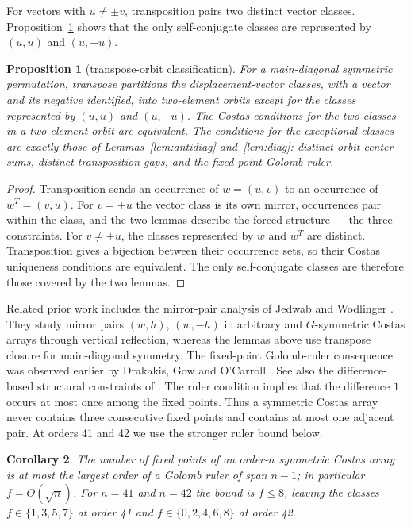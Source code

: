 \documentclass[11pt]{article}
\newtheorem{proposition}{Proposition}
\newtheorem{corollary}[proposition]{Corollary}
\begin{document}
For vectors with $u\neq\pm v$, transposition pairs two distinct vector
classes.  Proposition~\ref{prop:complete} shows that the only
self-conjugate classes are represented by $(u,u)$ and $(u,-u)$.

\begin{proposition}[transpose-orbit classification]
\label{prop:complete}
For a main-diagonal symmetric permutation, transpose partitions the
displacement-vector classes, with a vector and its negative identified,
into two-element orbits except for the classes represented by $(u,u)$ and
$(u,-u)$.  The Costas conditions for the two classes in a two-element
orbit are equivalent.  The conditions for the exceptional classes are
exactly those of Lemmas~\ref{lem:antidiag} and~\ref{lem:diag}: distinct
orbit center sums, distinct transposition gaps, and the fixed-point Golomb
ruler.
\end{proposition}

\begin{proof}
Transposition sends an occurrence of $w=(u,v)$ to an occurrence of
$w^{T}=(v,u)$.  For $v=\pm u$ the vector class is its own mirror,
occurrences pair within the class, and the two lemmas describe the forced
structure --- the three constraints.  For $v\neq\pm u$, the classes
represented by $w$ and $w^{T}$ are distinct.  Transposition gives a
bijection between their occurrence sets, so their Costas uniqueness
conditions are equivalent.  The only self-conjugate classes are therefore
those covered by the two lemmas.
\end{proof}

Related prior work includes the mirror-pair analysis of Jedwab and
Wodlinger \cite{JedwabWodlinger2014}.  They study mirror pairs $(w,h)$,
$(w,-h)$ in arbitrary and $G$-symmetric Costas arrays through vertical
reflection, whereas the lemmas above use transpose closure for
main-diagonal symmetry.  The fixed-point Golomb-ruler consequence was
observed earlier by Drakakis, Gow and O'Carroll
\cite{DrakakisGowOCarroll2006}.  See also the difference-based structural
constraints of \cite{CorrellSwanson2023}.  The ruler condition implies that the
difference $1$ occurs at most once among the fixed points.  Thus a
symmetric Costas array never contains three consecutive fixed points and
contains at most one adjacent pair.  At orders 41 and 42 we use the
stronger ruler bound below.

\begin{corollary}
\label{prop:ruler}
The number of fixed points of an order-$n$ symmetric Costas array is at
most the largest order of a Golomb ruler of span $n-1$; in particular
$f=O(\sqrt n)$.  For $n=41$ and $n=42$ the bound is $f\leq 8$, leaving the
classes $f\in\{1,3,5,7\}$ at order 41 and $f\in\{0,2,4,6,8\}$ at order 42.
\end{corollary}
\end{document}
